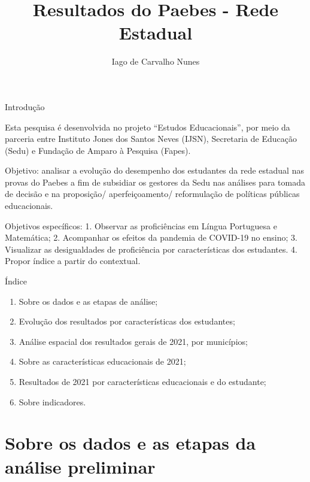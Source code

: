 \documentclass[
  ignorenonframetext,
]{beamer}
\title{Resultados do Paebes - Rede Estadual}
\author{Iago de Carvalho Nunes}
\date{}
\providecommand{\tightlist}{%
  \setlength{\itemsep}{0pt}\setlength{\parskip}{0pt}}
\begin{document}
\frame{\titlepage}

\begin{frame}
Introdução

Esta pesquisa é desenvolvida no projeto ``Estudos Educacionais'', por
meio da parceria entre Instituto Jones dos Santos Neves (IJSN),
Secretaria de Educação (Sedu) e Fundação de Amparo à Pesquisa (Fapes).

Objetivo: analisar a evolução do desempenho dos estudantes da rede
estadual nas provas do Paebes a fim de subsidiar os gestores da Sedu nas
análises para tomada de decisão e na proposição/ aperfeiçoamento/
reformulação de políticas públicas educacionais.

Objetivos específicos: 1. Observar as proficiências em Língua Portuguesa
e Matemática; 2. Acompanhar os efeitos da pandemia de COVID-19 no
ensino; 3. Visualizar as desigualdades de proficiência por
características dos estudantes. 4. Propor índice a partir do contextual.
\end{frame}

\begin{frame}
Índice

\begin{enumerate}[<+->]
\tightlist
\item
  Sobre os dados e as etapas de análise;
\item
  Evolução dos resultados por características dos estudantes;
\item
  Análise espacial dos resultados gerais de 2021, por municípios;
\item
  Sobre as características educacionais de 2021;
\item
  Resultados de 2021 por características educacionais e do estudante;
\item
  Sobre indicadores.
\end{enumerate}
\end{frame}

\hypertarget{sobre-os-dados-e-as-etapas-da-anuxe1lise-preliminar}{%
\section{Sobre os dados e as etapas da análise
preliminar}\label{sobre-os-dados-e-as-etapas-da-anuxe1lise-preliminar}}
\end{document}
